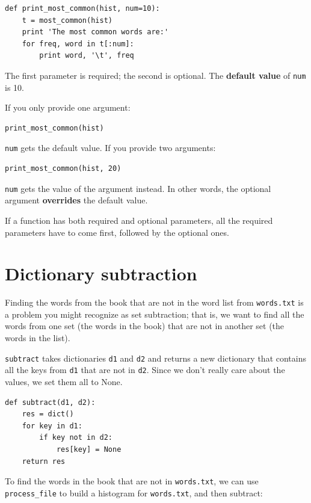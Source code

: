 \documentclass[10pt]{book}
\begin{document}
\begin{verbatim}
def print_most_common(hist, num=10):
    t = most_common(hist)
    print 'The most common words are:'
    for freq, word in t[:num]:
        print word, '\t', freq
\end{verbatim}

The first parameter is required; the second is optional.
The {\bf default value} of {\tt num} is 10.

If you only provide one argument:

\begin{verbatim}
print_most_common(hist)
\end{verbatim}

{\tt num} gets the default value.  If you provide two arguments:

\begin{verbatim}
print_most_common(hist, 20)
\end{verbatim}

{\tt num} gets the value of the argument instead.  In other
words, the optional argument {\bf overrides} the default value.

If a function has both required and optional parameters, all
the required parameters have to come first, followed by the
optional ones.


\section{Dictionary subtraction}

Finding the words from the book that are not in the word list
from {\tt words.txt} is a problem you might recognize as set
subtraction; that is, we want to find all the words from one
set (the words in the book) that are not in another set (the
words in the list).

{\tt subtract} takes dictionaries {\tt d1} and {\tt d2} and returns a
new dictionary that contains all the keys from {\tt d1} that are not
in {\tt d2}.  Since we don't really care about the values, we
set them all to None.

\begin{verbatim}
def subtract(d1, d2):
    res = dict()
    for key in d1:
        if key not in d2:
            res[key] = None
    return res
\end{verbatim}
%
To find the words in the book that are not in {\tt words.txt},
we can use \verb"process_file" to build a histogram for
{\tt words.txt}, and then subtract:
\end{document}
